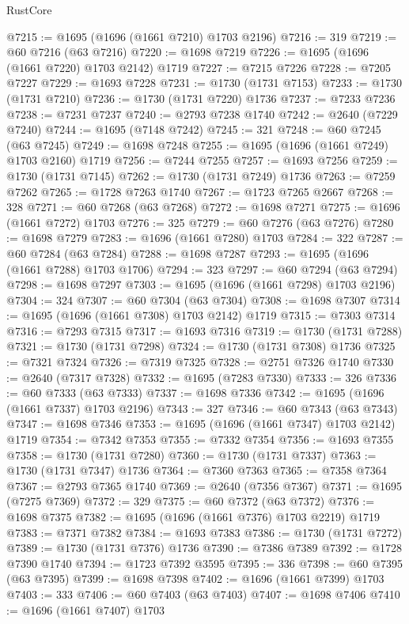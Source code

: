 \begin{lexlean}{RustCore}
\begin{coremodule}
@7215 := @1695 (@1696 (@1661 @7210) @1703 @2196)
@7216 := 319
@7219 := @60 @7216 (@63 @7216)
@7220 := @1698 @7219
@7226 := @1695 (@1696 (@1661 @7220) @1703 @2142) @1719
@7227 := @7215 @7226
@7228 := @7205 @7227
@7229 := @1693 @7228
@7231 := @1730 (@1731 @7153)
@7233 := @1730 (@1731 @7210)
@7236 := @1730 (@1731 @7220) @1736
@7237 := @7233 @7236
@7238 := @7231 @7237
@7240 := @2793 @7238 @1740
@7242 := @2640 (@7229 @7240)
@7244 := @1695 (@7148 @7242)
@7245 := 321
@7248 := @60 @7245 (@63 @7245)
@7249 := @1698 @7248
@7255 := @1695 (@1696 (@1661 @7249) @1703 @2160) @1719
@7256 := @7244 @7255
@7257 := @1693 @7256
@7259 := @1730 (@1731 @7145)
@7262 := @1730 (@1731 @7249) @1736
@7263 := @7259 @7262
@7265 := @1728 @7263 @1740
@7267 := @1723 @7265 @2667
@7268 := 328
@7271 := @60 @7268 (@63 @7268)
@7272 := @1698 @7271
@7275 := @1696 (@1661 @7272) @1703
@7276 := 325
@7279 := @60 @7276 (@63 @7276)
@7280 := @1698 @7279
@7283 := @1696 (@1661 @7280) @1703
@7284 := 322
@7287 := @60 @7284 (@63 @7284)
@7288 := @1698 @7287
@7293 := @1695 (@1696 (@1661 @7288) @1703 @1706)
@7294 := 323
@7297 := @60 @7294 (@63 @7294)
@7298 := @1698 @7297
@7303 := @1695 (@1696 (@1661 @7298) @1703 @2196)
@7304 := 324
@7307 := @60 @7304 (@63 @7304)
@7308 := @1698 @7307
@7314 := @1695 (@1696 (@1661 @7308) @1703 @2142) @1719
@7315 := @7303 @7314
@7316 := @7293 @7315
@7317 := @1693 @7316
@7319 := @1730 (@1731 @7288)
@7321 := @1730 (@1731 @7298)
@7324 := @1730 (@1731 @7308) @1736
@7325 := @7321 @7324
@7326 := @7319 @7325
@7328 := @2751 @7326 @1740
@7330 := @2640 (@7317 @7328)
@7332 := @1695 (@7283 @7330)
@7333 := 326
@7336 := @60 @7333 (@63 @7333)
@7337 := @1698 @7336
@7342 := @1695 (@1696 (@1661 @7337) @1703 @2196)
@7343 := 327
@7346 := @60 @7343 (@63 @7343)
@7347 := @1698 @7346
@7353 := @1695 (@1696 (@1661 @7347) @1703 @2142) @1719
@7354 := @7342 @7353
@7355 := @7332 @7354
@7356 := @1693 @7355
@7358 := @1730 (@1731 @7280)
@7360 := @1730 (@1731 @7337)
@7363 := @1730 (@1731 @7347) @1736
@7364 := @7360 @7363
@7365 := @7358 @7364
@7367 := @2793 @7365 @1740
@7369 := @2640 (@7356 @7367)
@7371 := @1695 (@7275 @7369)
@7372 := 329
@7375 := @60 @7372 (@63 @7372)
@7376 := @1698 @7375
@7382 := @1695 (@1696 (@1661 @7376) @1703 @2219) @1719
@7383 := @7371 @7382
@7384 := @1693 @7383
@7386 := @1730 (@1731 @7272)
@7389 := @1730 (@1731 @7376) @1736
@7390 := @7386 @7389
@7392 := @1728 @7390 @1740
@7394 := @1723 @7392 @3595
@7395 := 336
@7398 := @60 @7395 (@63 @7395)
@7399 := @1698 @7398
@7402 := @1696 (@1661 @7399) @1703
@7403 := 333
@7406 := @60 @7403 (@63 @7403)
@7407 := @1698 @7406
@7410 := @1696 (@1661 @7407) @1703

\end{coremodule}
\end{lexlean}
